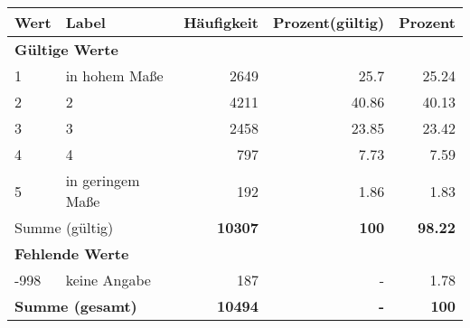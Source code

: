      \begin{longtable}{lXrrr}
     \toprule
     \textbf{Wert} & \textbf{Label} & \textbf{Häufigkeit} & \textbf{Prozent(gültig)} & \textbf{Prozent} \\
     \endhead
     \midrule
     \multicolumn{5}{l}{\textbf{Gültige Werte}}\\

     1 &
     \multicolumn{1}{X}{ in hohem Maße   } &


       \num{2649} &
       \num[round-mode=places,round-precision=2]{25.7} &
         \num[round-mode=places,round-precision=2]{25.24} \\

     2 &
     \multicolumn{1}{X}{ 2   } &


       \num{4211} &
       \num[round-mode=places,round-precision=2]{40.86} &
         \num[round-mode=places,round-precision=2]{40.13} \\

     3 &
     \multicolumn{1}{X}{ 3   } &


       \num{2458} &
       \num[round-mode=places,round-precision=2]{23.85} &
         \num[round-mode=places,round-precision=2]{23.42} \\

     4 &
     \multicolumn{1}{X}{ 4   } &


       \num{797} &
       \num[round-mode=places,round-precision=2]{7.73} &
         \num[round-mode=places,round-precision=2]{7.59} \\

     5 &
     \multicolumn{1}{X}{ in geringem Maße   } &


       \num{192} &
       \num[round-mode=places,round-precision=2]{1.86} &
         \num[round-mode=places,round-precision=2]{1.83} \\
     \midrule
     \multicolumn{2}{l}{Summe (gültig)} &
       \textbf{\num{10307}} &
     \textbf{\num{100}} &
       \textbf{\num[round-mode=places,round-precision=2]{98.22}} \\
     \multicolumn{5}{l}{\textbf{Fehlende Werte}}\\
       -998 &
       keine Angabe &
         \num{187} &
        - &
         \num[round-mode=places,round-precision=2]{1.78} \\
     \midrule
     \multicolumn{2}{l}{\textbf{Summe (gesamt)}} &
          \textbf{\num{10494}} &
        \textbf{-} &
        \textbf{\num{100}} \\
     \bottomrule
     \end{longtable}
     
